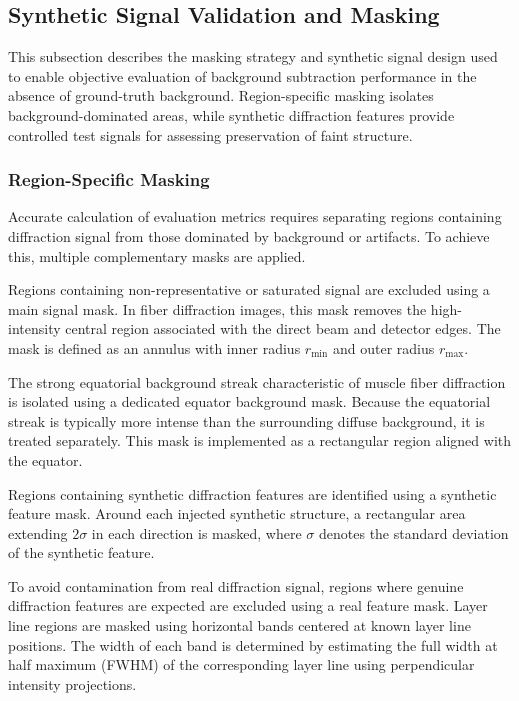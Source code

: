 \documentclass[iucr]{iucrjournals}
\begin{document}
\subsection{Synthetic Signal Validation and Masking}

This subsection describes the masking strategy and synthetic signal design used to enable objective evaluation of background subtraction performance in the absence of ground-truth background. Region-specific masking isolates background-dominated areas, while synthetic diffraction features provide controlled test signals for assessing preservation of faint structure.

\subsubsection{Region-Specific Masking}

Accurate calculation of evaluation metrics requires separating regions containing diffraction signal from those dominated by background or artifacts. To achieve this, multiple complementary masks are applied.

Regions containing non-representative or saturated signal are excluded using a main signal mask. In fiber diffraction images, this mask removes the high-intensity central region associated with the direct beam and detector edges. The mask is defined as an annulus with inner radius $r_{\mathrm{min}}$ and outer radius $r_{\mathrm{max}}$.

The strong equatorial background streak characteristic of muscle fiber diffraction is isolated using a dedicated equator background mask. Because the equatorial streak is typically more intense than the surrounding diffuse background, it is treated separately. This mask is implemented as a rectangular region aligned with the equator.

Regions containing synthetic diffraction features are identified using a synthetic feature mask. Around each injected synthetic structure, a rectangular area extending $2\sigma$ in each direction is masked, where $\sigma$ denotes the standard deviation of the synthetic feature.

To avoid contamination from real diffraction signal, regions where genuine diffraction features are expected are excluded using a real feature mask. Layer line regions are masked using horizontal bands centered at known layer line positions. The width of each band is determined by estimating the full width at half maximum (FWHM) of the corresponding layer line using perpendicular intensity projections.
\end{document}
